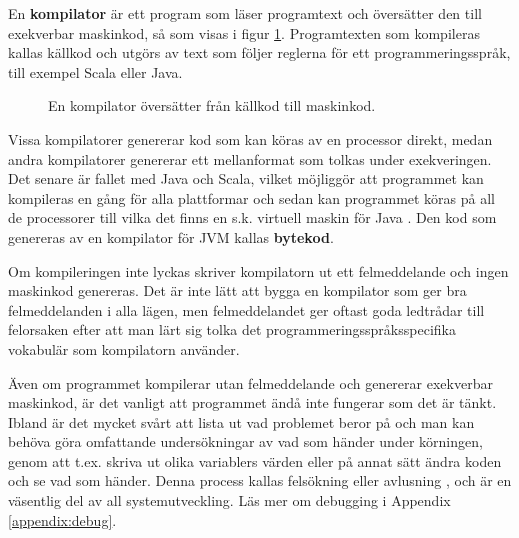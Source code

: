 En \textbf{kompilator}  är ett program som läser programtext och översätter den till exekverbar maskinkod, så som visas i figur \ref{fig:appendix:compiler}. Programtexten som kompileras kallas källkod och utgörs av text som följer reglerna för ett programmeringsspråk, till exempel Scala eller Java.

\begin{figure}[H]
\centering
{}
    \caption{En kompilator översätter från källkod till maskinkod.}
    \label{fig:appendix:compiler}
\end{figure}




Vissa kompilatorer genererar kod som kan köras av en processor direkt, medan andra kompilatorer genererar ett mellanformat som tolkas under exekveringen. Det senare är fallet med Java och Scala, vilket möjliggör att programmet kan kompileras en gång för alla plattformar och sedan kan programmet köras på all de processorer till vilka det finns en s.k. virtuell maskin för Java . Den kod som genereras av en kompilator för JVM kallas \textbf{bytekod}.

Om kompileringen inte lyckas skriver kompilatorn ut ett felmeddelande och ingen maskinkod genereras. Det är inte lätt att bygga en kompilator som ger bra felmeddelanden i alla lägen, men felmeddelandet ger oftast goda ledtrådar till felorsaken efter att man lärt sig tolka det programmeringsspråksspecifika vokabulär som kompilatorn använder.

Även om programmet kompilerar utan felmeddelande och genererar exekverbar maskinkod, är det vanligt att programmet ändå inte fungerar som det är tänkt. Ibland är det mycket svårt att lista ut vad problemet beror på och man kan behöva göra omfattande undersökningar av vad som händer under körningen, genom att t.ex. skriva ut olika variablers värden eller på annat sätt ändra koden och se vad som händer. Denna process kallas felsökning eller avlusning , och är en väsentlig del av all systemutveckling. Läs mer om debugging i Appendix \ref{appendix:debug}.

